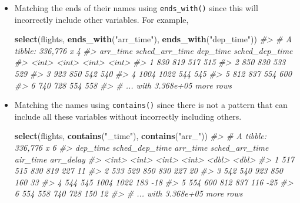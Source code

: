 \documentclass[]{book}
\newenvironment{Shaded}{\begin{snugshade}}{\end{snugshade}}
\newcommand{\CommentTok}[1]{\textcolor[rgb]{0.56,0.35,0.01}{\textit{#1}}}
\newcommand{\KeywordTok}[1]{\textcolor[rgb]{0.13,0.29,0.53}{\textbf{#1}}}
\newcommand{\NormalTok}[1]{#1}
\newcommand{\StringTok}[1]{\textcolor[rgb]{0.31,0.60,0.02}{#1}}
\theoremstyle{plain}
\theoremstyle{remark}
\begin{document}
\begin{itemize}
\item
  Matching the ends of their names using \texttt{ends\_with()} since
  this will incorrectly include other variables. For example,

\begin{Shaded}
\begin{Highlighting}[]
\KeywordTok{select}\NormalTok{(flights, }\KeywordTok{ends_with}\NormalTok{(}\StringTok{"arr_time"}\NormalTok{), }\KeywordTok{ends_with}\NormalTok{(}\StringTok{"dep_time"}\NormalTok{))}
\CommentTok{#> # A tibble: 336,776 x 4}
\CommentTok{#>   arr_time sched_arr_time dep_time sched_dep_time}
\CommentTok{#>      <int>          <int>    <int>          <int>}
\CommentTok{#> 1      830            819      517            515}
\CommentTok{#> 2      850            830      533            529}
\CommentTok{#> 3      923            850      542            540}
\CommentTok{#> 4     1004           1022      544            545}
\CommentTok{#> 5      812            837      554            600}
\CommentTok{#> 6      740            728      554            558}
\CommentTok{#> # ... with 3.368e+05 more rows}
\end{Highlighting}
\end{Shaded}
\item
  Matching the names using \texttt{contains()} since there is not a
  pattern that can include all these variables without incorrectly
  including others.

\begin{Shaded}
\begin{Highlighting}[]
\KeywordTok{select}\NormalTok{(flights, }\KeywordTok{contains}\NormalTok{(}\StringTok{"_time"}\NormalTok{), }\KeywordTok{contains}\NormalTok{(}\StringTok{"arr_"}\NormalTok{))}
\CommentTok{#> # A tibble: 336,776 x 6}
\CommentTok{#>   dep_time sched_dep_time arr_time sched_arr_time air_time arr_delay}
\CommentTok{#>      <int>          <int>    <int>          <int>    <dbl>     <dbl>}
\CommentTok{#> 1      517            515      830            819      227        11}
\CommentTok{#> 2      533            529      850            830      227        20}
\CommentTok{#> 3      542            540      923            850      160        33}
\CommentTok{#> 4      544            545     1004           1022      183       -18}
\CommentTok{#> 5      554            600      812            837      116       -25}
\CommentTok{#> 6      554            558      740            728      150        12}
\CommentTok{#> # ... with 3.368e+05 more rows}
\end{Highlighting}
\end{Shaded}
\end{itemize}
\end{document}
